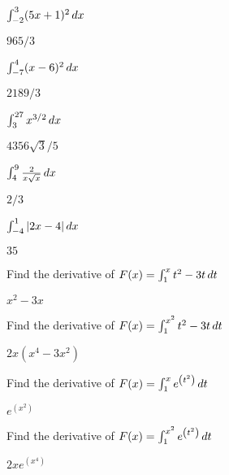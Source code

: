 \begin{exercises}
\begin{exercise} $\int_{-2}^3 (5x+1)^2\, d x$
\begin{answer} $965/3$
\end{answer}\end{exercise}

\begin{exercise} $\int_{-7}^4(x-6)^2 \, d x$
\begin{answer} $2189/3$
\end{answer}\end{exercise}

\begin{exercise} $\int_3^{27}x^{3/2}\, d x$
\begin{answer} $4356 \sqrt{3}/5$
\end{answer}\end{exercise}

\begin{exercise} $\int_4^9\frac{2}{x\sqrt x}\, d x$
\begin{answer} $2/3$
\end{answer}\end{exercise}

\begin{exercise} $\int_{-4}^1|2x-4|\, d x$
\begin{answer} $35$
\end{answer}\end{exercise}

\endtwocol

\begin{exercise} Find the derivative of $F(x)=\int_1^x t^2-3t\, d t$
\begin{answer} $x^2-3x$
\end{answer}\end{exercise}

\begin{exercise} Find the derivative of $F(x)=\int_1^{x^2} t^2-3t\, d t$
\begin{answer} $2x(x^4-3x^2)$
\end{answer}\end{exercise}

\begin{exercise} Find the derivative of $F(x)=\int_1^x e^{\left(t^2\right)}\, d t$
\begin{answer} $e^{\left(x^2\right)}$
\end{answer}\end{exercise}

\begin{exercise} Find the derivative of $F(x)=\int_1^{x^2} e^{\left(t^2\right)}\, d t$
\begin{answer} $2xe^{\left(x^4\right)}$
\end{answer}\end{exercise}



\end{exercises}
